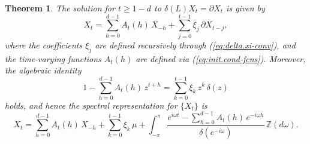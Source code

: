 \documentclass[a4paper]{book}
\def\ZZ{\mathbb Z}
\newtheorem{Theorem}{Theorem}
\begin{document}
 \begin{Theorem}
 \label{thm:nonstat-rep}
 The solution for $t \geq 1-d$ to $\delta (L) X_t = \partial X_t$ is given by
\begin{equation}
 \label{eq:nonstatCausalRep}
 X_t  = \sum_{h=0}^{d-1} A_{t} (h) \, X_{-h} + 
  \sum_{j=0}^{t-1} \xi_j \, \partial X_{t-j},
\end{equation}
 where the coefficients $\xi_j$ are defined recursively through (\ref{eq:delta.xi-conv}),
  and the time-varying functions $A_t (h)$ are defined via (\ref{eq:init.cond-fcns}).
  Moreover, the algebraic identity 
\begin{equation}
 \label{eq:Identity1}
  1 - \sum_{h=0}^{d-1} A_{t} (h) \, z^{t+h} = \sum_{k=0}^{t-1} \xi_k \, z^k
  \, \delta (z)
\end{equation}
holds, and hence the   spectral representation for
 $\{ X_t\}$ is
\begin{equation}
 \label{eq:nonstatRep-spec}
  X_t = \sum_{h=0}^{d-1} A_{t} (h) \, X_{-h}  +
   \sum_{k=0}^{t-1} \xi_k \, \mu +
  \int_{-\pi}^{\pi}
   \frac{ e^{i \omega t} - \sum_{h=0}^{d-1} A_{t} (h) \,  e^{-i \omega h } 
    }{ \delta (e^{-i \omega}) } \, \ZZ (d\omega).
\end{equation}
\end{Theorem}  
  
\end{document}
